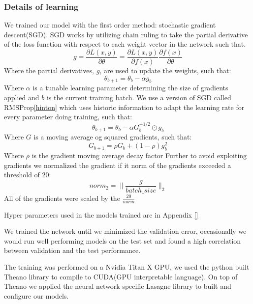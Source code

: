 \documentclass{article}
\begin{document}
\subsubsection{Details of learning}
\label{sssec:Detailsoflearning}
We trained our model with the first order method: stochastic gradient descent(SGD). SGD works by utilizing chain ruling to take the partial derivative of the loss function with respect to each weight vector in the network such that.
\begin{equation}
g = \frac{\partial L(x, y)}{\partial \theta} = \frac{\partial L(x, y)}{\partial f(x)} \frac{\partial f(x)}{\partial \theta}
\end{equation}
Where the partial derivatives, $g$, are used to update the weights, such that:
\begin{equation}
\theta_{b+1} = \theta_b - \alpha g_b
\end{equation}
Where $\alpha$ is a tunable learning parameter determining the size of gradients applied and $b$ is the current training batch.
We use a version of SGD called RMSProp\ref{hinton} which uses historic information to adapt the learning rate for every parameter doing training, such that:
\begin{equation}
\theta_{b+1} = \theta_b - \alpha G^{-1/2}_b \odot g_b
\end{equation}
Where $G$ is a moving average og squared gradients, such that:
\begin{equation}
G_{b+1} = \rho G_{b} + (1-\rho) g^2_{b}
\end{equation}
Where $\rho$ is the gradient moving average decay factor
Further to avoid exploiting gradients we normalized the gradient if it norm of the gradients exceeded a threshold of 20:
\begin{equation}
norm_2 = \|\frac{g}{batch\_size}\|_2
\end{equation}
All of the gradients were scaled by the $\frac{20}{norm}$

Hyper parameters used in the models trained are in Appendix \ref{}

We trained the network until we minimized the validation error, occasionally we would run well performing models on the test set and found a high correlation between validation and the test performance.

The training was performed on a Nvidia Titan X GPU, we used the python built Theano library\cite{bergstra+al:2010-scipy}\cite{Bastien-Theano-2012} to compile to CUDA(GPU interpretable language). On top of Theano we applied the neural network specific Lasagne library to built and configure our models\cite{sander_dieleman_2015_27878}.\\
\end{document}
